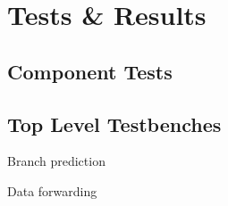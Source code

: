 \section{Tests \& Results}

\subsection{Component Tests}

\subsection{Top Level Testbenches}

Branch prediction

Data forwarding
